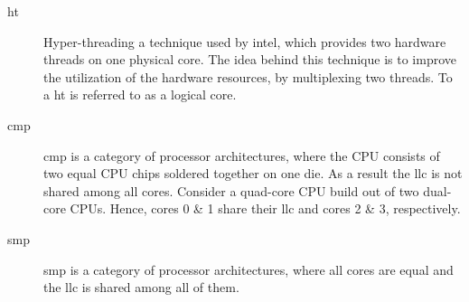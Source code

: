 \begin{description}
  \item[\Gls{ht}] Hyper-threading a technique used by \gls{intel}, which provides
    two hardware threads on one physical core.
    The idea behind this technique is to improve the utilization of the
    hardware resources, by multiplexing two threads.
    To a \Gls{ht} is referred to as a logical core.

  \item[\Gls{cmp}] \gls{cmp} is a category of processor architectures, where
    the CPU consists of two equal CPU chips soldered together on one die.
    As a result the \gls{llc} is not shared among all cores.
    Consider a quad-core CPU build out of two dual-core CPUs.
    Hence, cores 0 \& 1 share their \gls{llc} and cores 2 \& 3, respectively.

  \item[\Gls{smp}] \gls{smp} is a category of processor architectures, where
    all cores are equal and the \gls{llc} is shared among all of them.

\end{description}
